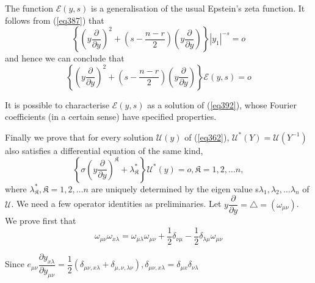 The function $\mathscr{E}(y, s)$ is a generalisation of the usual
Epstein's zeta function. It follows from (\ref{eq387}) that  
$$
\left\{ (y \frac{\partial}{\partial y})^2 + (s - \frac{n - r}{2}) (y
\frac{\partial}{\partial y}) \right\} | y_1 |^{-s} = o 
$$
and hence we can conclude that
\begin{equation*}
\left\{ (y \frac{\partial}{\partial y})^2 + (s - \frac{n - r}{2}) (y
\frac{\partial}{\partial y}) \right\} \mathscr{E} (y, s) = o
\tag{392}\label{eq392}  
\end{equation*}

It is possible to characterise $\mathscr{E} (y, s)$ as a solution of
(\ref{eq392}), whose Fourier coefficients (in a certain sense) have
specified properties. 

Finally we prove that for every solution $\mathcal{U}(y)$ of (\ref{eq362}),
$\mathcal{U}^* (Y) = \mathcal{U} (Y^{-1})$ also satisfies a
differential equation of the same kind,  
$$
\left \{ \sigma (y \frac{\partial}{\partial y})^\mathfrak{K} +
\lambda^*_\mathfrak{K} \right\} \mathcal{U}^* (y) = o, \mathfrak{K} = 1,
2, \ldots n, 
$$
where $\lambda^*_\mathfrak{K}, \mathfrak{K} = 1, 2, \ldots n$ are
uniquely determined by the eigen value s\pageoriginale $\lambda_1,
\lambda_2, \ldots \lambda_n$ of $\mathcal{U}$. We need a few operator
identities as preliminaries. Let $y \dfrac{\partial}{\partial y} =
\triangle = (\omega_{\mu \nu})$. We prove first that   
\begin{equation*}
\omega_{\mu \nu} \omega_{x \lambda} = \omega_{\mu \lambda} \omega_{\mu
  \nu} + \frac{1}{2} \delta_{\nu \mu} - \frac{1}{2} \delta_{\lambda
  \mu} \omega_{\mu \nu} \tag{393}\label{eq393} 
\end{equation*}

Since $e_{\mu \nu} \dfrac{\partial y_{x \lambda}}{\partial y_{\mu
    \nu}} = \dfrac{1}{2} (\delta_{\mu \nu, x \lambda} + \delta_{\mu,
  \nu, \lambda \nu}), \delta_{\mu \nu, x \lambda} = \delta_{\mu x  }
\delta_{\nu \lambda}$ 

